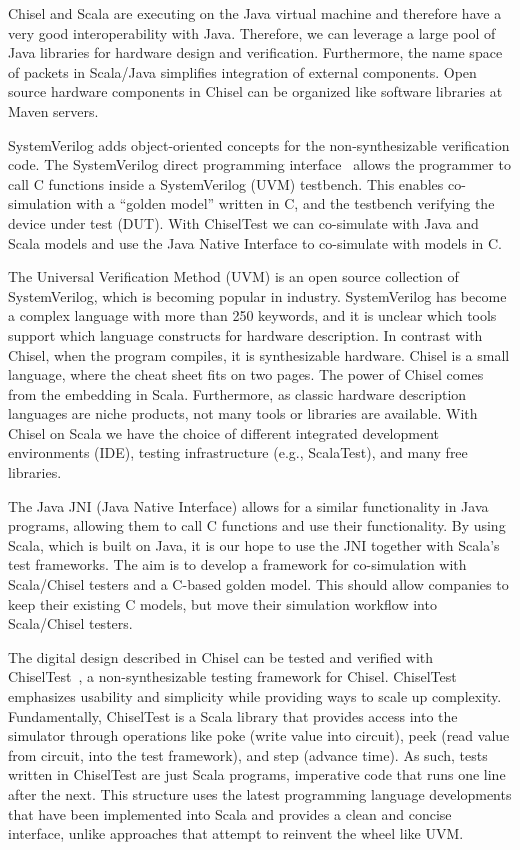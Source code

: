 \documentclass[runningheads]{llncs}
\begin{document}
Chisel and Scala are executing on the Java virtual machine and therefore have a very good
interoperability with Java. Therefore, we can leverage a large pool of Java libraries for
hardware design and  verification.
Furthermore, the name space of packets in Scala/Java simplifies integration of
external components.
Open source hardware components in Chisel can be organized like software
libraries at Maven servers.


SystemVerilog adds object-oriented concepts for the non-synthesizable verification code.
The SystemVerilog direct programming interface~\cite{Doulos:SV:dpi} allows the programmer to call
C functions inside a SystemVerilog (UVM) testbench.
This enables co-simulation with a ``golden model'' written in C, and the
testbench verifying the device under test (DUT).
With ChiselTest we can co-simulate with Java and Scala models and use the Java Native Interface
to co-simulate with models in C.

The Universal Verification Method (UVM) is an open source collection of SystemVerilog,
which is becoming popular in industry.
SystemVerilog has become a complex language with more than 250 keywords, and it is unclear
which tools support which language constructs for hardware description.
In contrast with Chisel, when the program compiles, it is synthesizable hardware.
Chisel is a small language, where the cheat sheet fits on two pages.
The power of Chisel comes from the embedding in Scala.
Furthermore, as classic hardware description languages are niche products, not
many tools or libraries are available. 
With Chisel on Scala we have the choice of different integrated development environments (IDE),
testing infrastructure (e.g., ScalaTest), and many free libraries.

The Java JNI (Java Native Interface) allows for a similar functionality in Java programs,
allowing them to call C functions and use their functionality.
By using Scala, which is built on Java, it is our hope to use the JNI together with Scala's test frameworks.
The aim is to develop a framework for co-simulation with Scala/Chisel testers and a
C-based golden model. This should allow companies to keep their existing C models,
but move their simulation workflow into Scala/Chisel testers.

The digital design described in Chisel can be tested and verified with
ChiselTest~\cite{chisel:tester2}, a non-synthesizable testing framework for Chisel.
ChiselTest emphasizes usability and simplicity while providing ways to scale up complexity.
Fundamentally, ChiselTest is a Scala library that provides access into the simulator through
operations like poke (write value into circuit), peek (read value from circuit, into the test framework), and step (advance time).
As such, tests written in ChiselTest are just Scala programs, imperative code that runs one line after the next.
This structure uses the latest programming language developments that have been implemented into Scala
and provides a clean and concise interface, unlike approaches that attempt to reinvent the wheel like UVM.
\end{document}
